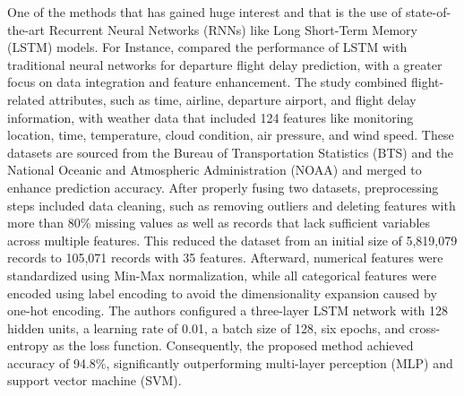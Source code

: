 \documentclass[twoside,11pt]{article}
\begin{document}
One of the methods that has gained huge interest and that is the use of state-of-the-art Recurrent Neural Networks (RNNs) like Long Short-Term Memory (LSTM) models. For Instance, \cite{liu2022flight} compared the performance of LSTM with traditional neural networks for departure flight delay prediction, with a greater focus on data integration and feature enhancement. The study combined flight-related attributes, such as time, airline, departure airport, and flight delay information, with weather data that included 124 features like monitoring location, time, temperature, cloud condition, air pressure, and wind speed. These datasets are sourced from the Bureau of Transportation Statistics (BTS) and the National Oceanic and Atmospheric Administration (NOAA) and merged to enhance prediction accuracy. After properly fusing two datasets, preprocessing steps included data cleaning, such as removing outliers and deleting features with more than 80\% missing values as well as records that lack sufficient variables across multiple features. This reduced the dataset from an initial size of 5,819,079 records to 105,071 records with 35 features. Afterward, numerical features were standardized using Min-Max normalization, while all categorical features were encoded using label encoding to avoid the dimensionality expansion caused by one-hot encoding. The authors configured a three-layer LSTM network with 128 hidden units, a learning rate of 0.01, a batch size of 128, six epochs, and cross-entropy as the loss function. Consequently, the proposed method achieved accuracy of 94.8\%, significantly outperforming multi-layer perception (MLP) and support vector machine (SVM).  
\end{document}
